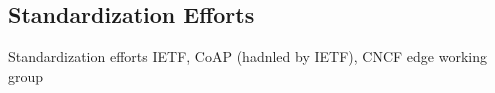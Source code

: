 \subsection{Standardization Efforts}
Standardization efforts IETF, CoAP (hadnled by IETF), CNCF edge working group